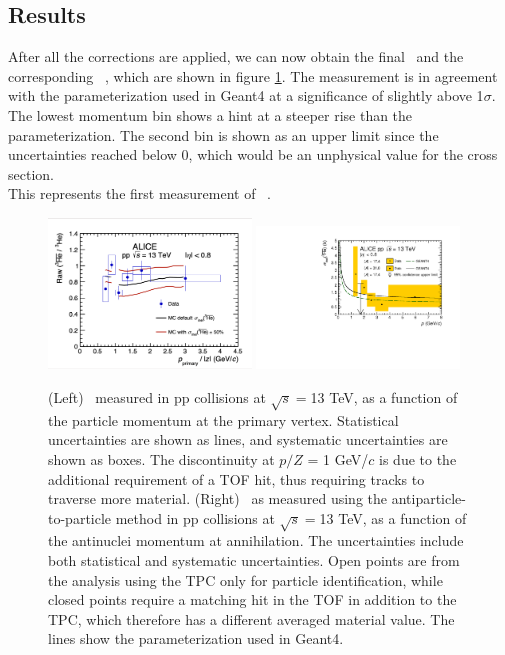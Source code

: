 \subsection{Results}
After all the corrections are applied, we can now obtain the final \ratio\ and the corresponding \sigmainel\ , which are shown in figure \ref{fig:Ahe_sigma_inel_pp}. The measurement is in agreement with the parameterization used in Geant4 at a significance of slightly above 1$\sigma$. The lowest momentum bin shows a hint at a steeper rise than the parameterization. The second bin is shown as an upper limit since the uncertainties reached below 0, which would be an unphysical value for the cross section. \\

This represents the first measurement of \sigmainel\ .
\begin{figure}
    \centering
    \includegraphics[width=0.48\textwidth]{figures/he3bar_he3_ratio.png}
    \includegraphics[width=0.48\textwidth]{figures/Antihelium_inelastic_cross_section.pdf}
    \caption{(Left) \ratio\ measured in pp collisions at $\sqrt{s}=$13 TeV, as a function of the particle momentum at the primary vertex. Statistical uncertainties are shown as lines, and systematic uncertainties are shown as boxes. The discontinuity at $p/Z$ = 1 GeV/$c$ is due to the additional requirement of a TOF hit, thus requiring tracks to traverse more material. (Right) \sigmainel\ as measured using the antiparticle-to-particle method in pp collisions at $\sqrt{s}=$13 TeV, as a function of the antinuclei momentum at annihilation. The uncertainties include both statistical and systematic uncertainties. Open points are from the analysis using the TPC only for particle identification, while closed points require a matching hit in the TOF in addition to the TPC, which therefore has a different averaged material value. The lines show the parameterization used in Geant4.}
    \label{fig:Ahe_sigma_inel_pp}
\end{figure}


